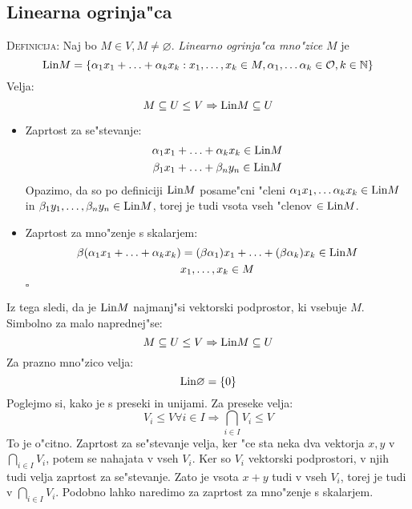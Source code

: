 \subsection{Linearna ogrinja"ca}
\textsc{Definicija:} Naj bo $M \in V, M \neq \varnothing$. \emph{Linearno ogrinja"ca mno"zice} $M$ je
\begin{equation*}
\text{Lin} M = \{\alpha_1 x_1 + \ldots +\alpha_k x_k: x_1, \ldots, x_k \in M, \alpha_1, \ldots \alpha_k \in \mathcal{O}, k \in \mathbb{N}\}
\end{equation*}
Velja:
\begin{equation*}
M \subseteq U \leq V \Rightarrow \text{Lin} M \subseteq U
\end{equation*}
\begin{itemize}
	\item Zaprtost za se"stevanje:
	\begin{gather*}
	\alpha_1 x_1 + \ldots + \alpha_k x_k \in \text{Lin} M \\
	\beta_1 x_1 + \ldots + \beta_n y_n \in \text{Lin} M
	\end{gather*}
	Opazimo, da so po definiciji $\text{Lin} M$ posame"cni "cleni $\alpha_1 x_1, \ldots \alpha_k x_k \in \text{Lin} M$ in $\beta_1 y_1, \ldots, \beta_n y_n \in \text{Lin} M$, torej je tudi vsota vseh "clenov $\in \text{Lin} M$.
	
	\item Zaprtost za mno"zenje s skalarjem:
	\begin{gather*}
		\beta(\alpha_1 x_1 + \ldots + \alpha_k x_k) = (\beta \alpha_1) x_1 + \ldots + (\beta \alpha_k)x_k \in \text{Lin} M \\
		x_1, \ldots, x_k \in M
	\end{gather*}
	\hfill $\square$
\end{itemize}
Iz tega sledi, da je $\text{Lin} M$ najmanj"si vektorski podprostor, ki vsebuje $M$. Simbolno za malo naprednej"se:
\begin{equation*}
M \subseteq U \leq V \Rightarrow \text{Lin} M \subseteq U
\end{equation*}
Za prazno mno"zico velja:
\begin{equation*}
\text{Lin} \varnothing = \{0\}
\end{equation*}
Poglejmo si, kako je s preseki in unijami. Za preseke velja:
\begin{equation*}
V_i \leq V \forall i \in I \Rightarrow \bigcap_{i \in I}V_i \leq V
\end{equation*}
To je o"citno. Zaprtost za se"stevanje velja, ker "ce sta neka dva vektorja $x, y$ v $\bigcap_{i \in I}V_i$, potem se nahajata v vseh $V_i$. Ker so $V_i$ vektorski podprostori, v njih tudi velja zaprtost za se"stevanje. Zato je vsota $x + y$ tudi v vseh $V_i$, torej je tudi v $\bigcap_{i \in I}V_i$. Podobno lahko naredimo za zaprtost za mno"zenje s skalarjem.

